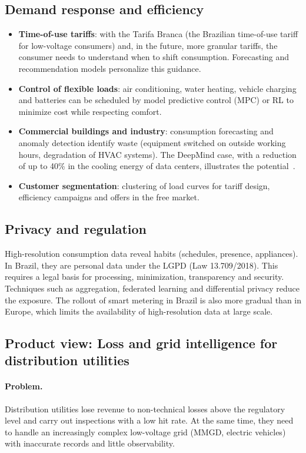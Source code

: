 \documentclass[10pt,a4paper,oneside]{article}
\newcommand{\visaoproduto}[1]{%
  \let\subsectionmarkbase\subsectionmark
  \renewcommand{\subsectionmark}[1]{\markright{\thesubsection\ Product view}}%
  \subsection{Product view: #1}%
  \let\subsectionmark\subsectionmarkbase}
\begin{document}
\subsection{Demand response and efficiency}

\begin{itemize}
  \item \textbf{Time-of-use tariffs}: with the Tarifa Branca (the Brazilian
    time-of-use tariff for low-voltage consumers) and, in the future, more
    granular tariffs, the consumer needs to understand when to shift
    consumption. Forecasting and recommendation models personalize this
    guidance.
  \item \textbf{Control of flexible loads}: air conditioning, water heating,
    vehicle charging and batteries can be scheduled by model predictive
    control (MPC) or RL to minimize cost while respecting comfort.
  \item \textbf{Commercial buildings and industry}: consumption forecasting
    and anomaly detection identify waste (equipment switched on outside
    working hours, degradation of HVAC systems). The DeepMind case, with a
    reduction of up to 40\% in the cooling energy of data centers,
    illustrates the potential~\cite{deepmindcooling}.
  \item \textbf{Customer segmentation}: clustering of load curves for tariff
    design, efficiency campaigns and offers in the free market.
\end{itemize}

\subsection{Privacy and regulation}

High-resolution consumption data reveal habits (schedules, presence,
appliances). In Brazil, they are personal data under the LGPD (Law
13.709/2018). This requires a legal basis for processing, minimization,
transparency and security. Techniques such as aggregation, federated
learning and differential privacy reduce the exposure. The rollout of smart
metering in Brazil is also more gradual than in Europe, which limits the
availability of high-resolution data at large scale.

\visaoproduto{Loss and grid intelligence for distribution utilities}

\paragraph{Problem.}
Distribution utilities lose revenue to non-technical losses above the
regulatory level and carry out inspections with a low hit rate. At the same
time, they need to handle an increasingly complex low-voltage grid (MMGD,
electric vehicles) with inaccurate records and little observability.
\end{document}
